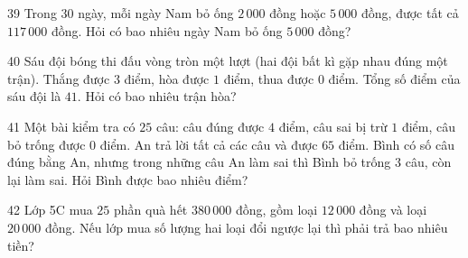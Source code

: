 \gap
\begin{probbox}{39}{}
Trong $30$ ngày, mỗi ngày Nam bỏ ống $2\,000$ đồng hoặc $5\,000$ đồng, được tất cả $117\,000$ đồng. Hỏi có bao nhiêu ngày Nam bỏ ống $5\,000$ đồng?
\end{probbox}
\gap
\begin{probbox}{40}{}
Sáu đội bóng thi đấu vòng tròn một lượt (hai đội bất kì gặp nhau đúng một trận). Thắng được $3$ điểm, hòa được $1$ điểm, thua được $0$ điểm. Tổng số điểm của sáu đội là $41$. Hỏi có bao nhiêu trận hòa?
\end{probbox}
\gap
\begin{probbox}{41}{}
Một bài kiểm tra có $25$ câu: câu đúng được $4$ điểm, câu sai bị trừ $1$ điểm, câu bỏ trống được $0$ điểm. An trả lời tất cả các câu và được $65$ điểm. Bình có số câu đúng bằng An, nhưng trong những câu An làm sai thì Bình bỏ trống $3$ câu, còn lại làm sai. Hỏi Bình được bao nhiêu điểm?
\end{probbox}
\gap
\begin{probbox}{42}{}
Lớp 5C mua $25$ phần quà hết $380\,000$ đồng, gồm loại $12\,000$ đồng và loại $20\,000$ đồng. Nếu lớp mua số lượng hai loại đổi ngược lại thì phải trả bao nhiêu tiền?
\end{probbox}
